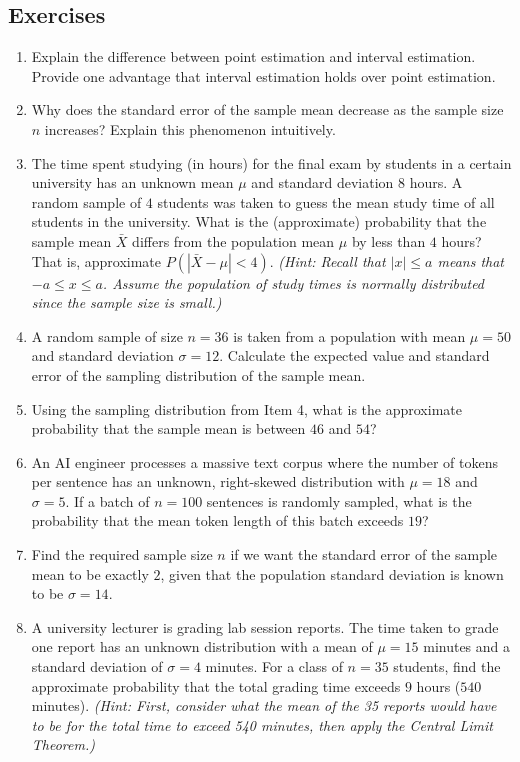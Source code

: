 \documentclass{article}
\begin{document}
\subsection{Exercises}
\begin{enumerate}
\item Explain the difference between point estimation and interval estimation. Provide one advantage that interval estimation holds over point estimation.
\item Why does the standard error of the sample mean decrease as the sample size $n$ increases? Explain this phenomenon intuitively.
\item The time spent studying (in hours) for the final exam by students in a certain university has an unknown mean $\mu$ and standard deviation $8$ hours. A random sample of $4$ students was taken to guess the mean study time of all students in the university. What is the (approximate) probability that the sample mean $\bar{X}$ differs from the population mean $\mu$ by less than $4$ hours? That is, approximate $P(|\bar{X}-\mu|<4)$. \emph{(Hint: Recall that $|x|\leq a$ means that $-a\leq x\leq a$. Assume the population of study times is normally distributed since the sample size is small.)}
\item A random sample of size $n=36$ is taken from a population with mean $\mu=50$ and standard deviation $\sigma=12$. Calculate the expected value and standard error of the sampling distribution of the sample mean.
\item Using the sampling distribution from Item 4, what is the approximate probability that the sample mean is between $46$ and $54$?
\item An AI engineer processes a massive text corpus where the number of tokens per sentence has an unknown, right-skewed distribution with $\mu=18$ and $\sigma=5$. If a batch of $n=100$ sentences is randomly sampled, what is the probability that the mean token length of this batch exceeds $19$?
\item Find the required sample size $n$ if we want the standard error of the sample mean to be exactly $2$, given that the population standard deviation is known to be $\sigma=14$.
\item A university lecturer is grading lab session reports. The time taken to grade one report has an unknown distribution with a mean of $\mu=15$ minutes and a standard deviation of $\sigma=4$ minutes. For a class of $n=35$ students, find the approximate probability that the total grading time exceeds $9$ hours ($540$ minutes). \emph{(Hint: First, consider what the mean of the 35 reports would have to be for the total time to exceed 540 minutes, then apply the Central Limit Theorem.)}
\end{enumerate}
\end{document}
